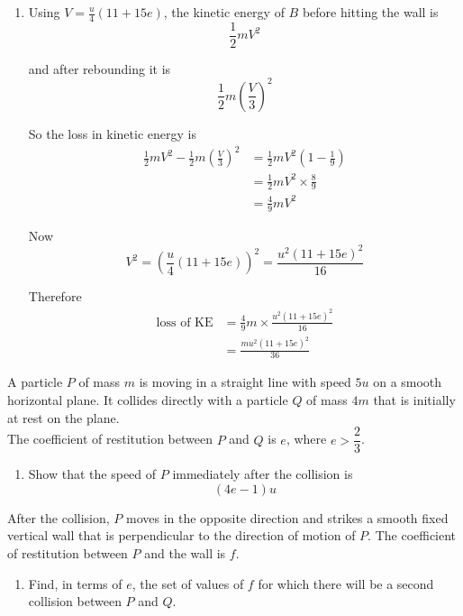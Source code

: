 \documentclass[leqno]{article}
\begin{document}
\begin{enumerate}[
  label=\textbf{\arabic*.},
  leftmargin=*,
  topsep=0pt,
  partopsep=0pt,
  parsep=0pt
]
\begin{djsSolution}
\begin{enumerate}[label=\textbf{(\alph*)}]
  \item Using $V=\frac{u}{4}(11+15e)$, the kinetic energy of $B$ before hitting the wall is
  \[
  \frac12 mV^2
  \]

  and after rebounding it is
  \[
  \frac12 m\left(\frac{V}{3}\right)^2
  \]

  So the loss in kinetic energy is
  \begin{align*}
  \frac12 mV^2-\frac12 m\left(\frac{V}{3}\right)^2
  &=\frac12 mV^2\left(1-\frac19\right)\\
  &=\frac12 mV^2\times \frac89\\
  &=\frac49 mV^2
  \end{align*}

  Now
  \[
  V^2=\left(\frac{u}{4}(11+15e)\right)^2=\frac{u^2(11+15e)^2}{16}
  \]

  Therefore
  \begin{align*}
  \text{loss of KE}
  &=\frac49 m\times \frac{u^2(11+15e)^2}{16}\\
  &=\frac{mu^2(11+15e)^2}{36}
  \end{align*}

\end{enumerate}
\end{djsSolution}


\newpage

\questionitem

A particle $P$ of mass $m$ is moving in a straight line with speed $5u$ on a smooth horizontal plane. It collides directly with a particle $Q$ of mass $4m$ that is initially at rest on the plane. \\

The coefficient of restitution between $P$ and $Q$ is $e$, where $e>\dfrac{2}{3}$. \\

\begin{enumerate}[label=\textbf{(\alph*)}]
  \item Show that the speed of $P$ immediately after the collision is
  \[
  (4e-1)u
  \]
\end{enumerate}
After the collision, $P$ moves in the opposite direction and strikes a smooth fixed vertical wall that is perpendicular to the direction of motion of $P$. The coefficient of restitution between $P$ and the wall is $f$. \\

\begin{enumerate}[label=\textbf{(\alph*)}, resume]
  \item Find, in terms of $e$, the set of values of $f$ for which there will be a second collision between $P$ and $Q$.  \\
\end{enumerate}


\end{enumerate}
\end{document}
